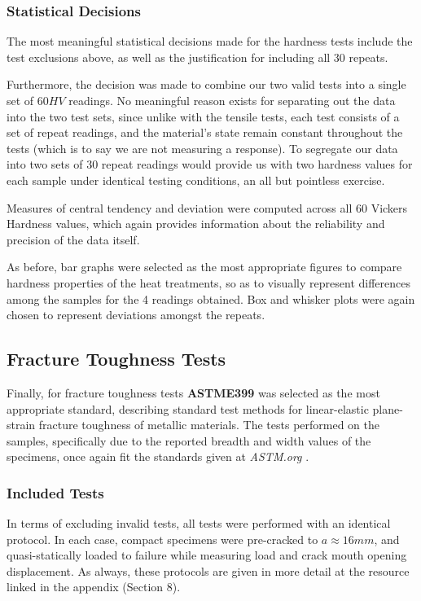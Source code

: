 \documentclass{article}
\begin{document}
\subsubsection{Statistical Decisions}
The most meaningful statistical decisions made for the hardness tests include the test exclusions above, as well as the justification for including all 30 repeats. 

Furthermore, the decision was made to combine our two valid tests into a single set of $60 HV$ readings. No meaningful reason exists for separating out the data into the two test sets, since unlike with the tensile tests, each test consists of a set of repeat readings, and the material's state remain constant throughout the tests (which is to say we are not measuring a response). To segregate our data into two sets of 30 repeat readings would provide us with two hardness values for each sample under identical testing conditions, an all but pointless exercise.

Measures of central tendency and deviation were computed across all 60 Vickers Hardness values, which again provides information about the reliability and precision of the data itself. 

As before, bar graphs were selected as the most appropriate figures to compare hardness properties of the heat treatments, so as to visually represent differences among the samples for the 4 readings obtained. Box and whisker plots were again chosen to represent deviations amongst the repeats.

\subsection{Fracture Toughness Tests}
Finally, for fracture toughness tests \textbf{ASTME399} was selected as the most appropriate standard, describing standard test methods for linear-elastic plane-strain fracture toughness of metallic materials. The tests performed on the samples, specifically due to the reported breadth and width values of the specimens, once again fit the standards given at \textit{ASTM.org} \cite{ASTME399}.

\subsubsection{Included Tests}
In terms of excluding invalid tests, all tests were performed with an identical protocol. In each case, compact specimens were pre-cracked to $a \approx 16mm$, and quasi-statically loaded to failure while measuring load and crack mouth opening displacement. As always, these protocols are given in more detail at the resource linked in the appendix (Section 8).
\end{document}
